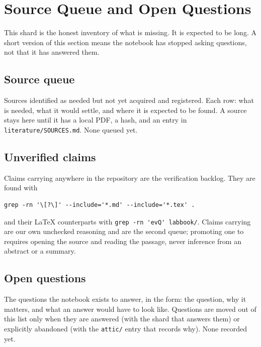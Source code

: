 
\section{Source Queue and Open Questions}
\label{sec:open-questions}

This shard is the honest inventory of what is missing. It is expected to be long. A short version
of this section means the notebook has stopped asking questions, not that it has answered them.

\subsection*{Source queue}

 Sources identified as needed but not yet acquired and registered. Each row: what is
needed, what it would settle, and where it is expected to be found. A source stays here until it
has a local PDF, a hash, and an entry in \texttt{literature/SOURCES.md}. None queued yet.

\subsection*{Unverified claims}

Claims carrying \evQ{} anywhere in the repository are the verification backlog. They are found
with

\begin{verbatim}
grep -rn '\[?\]' --include='*.md' --include='*.tex' .
\end{verbatim}

\noindent and their \LaTeX{} counterparts with \verb|grep -rn 'evQ' labbook/|. Claims carrying
\evI{} are our own unchecked reasoning and are the second queue; promoting one to \evS{}{} requires
opening the source and reading the passage, never inference from an abstract or a summary.

\subsection*{Open questions}

 The questions the notebook exists to answer, in the form: the question, why it
matters, and what an answer would have to look like. Questions are moved out of this list only when
they are answered (with the shard that answers them) or explicitly abandoned (with the
\texttt{attic/} entry that records why). None recorded yet.
